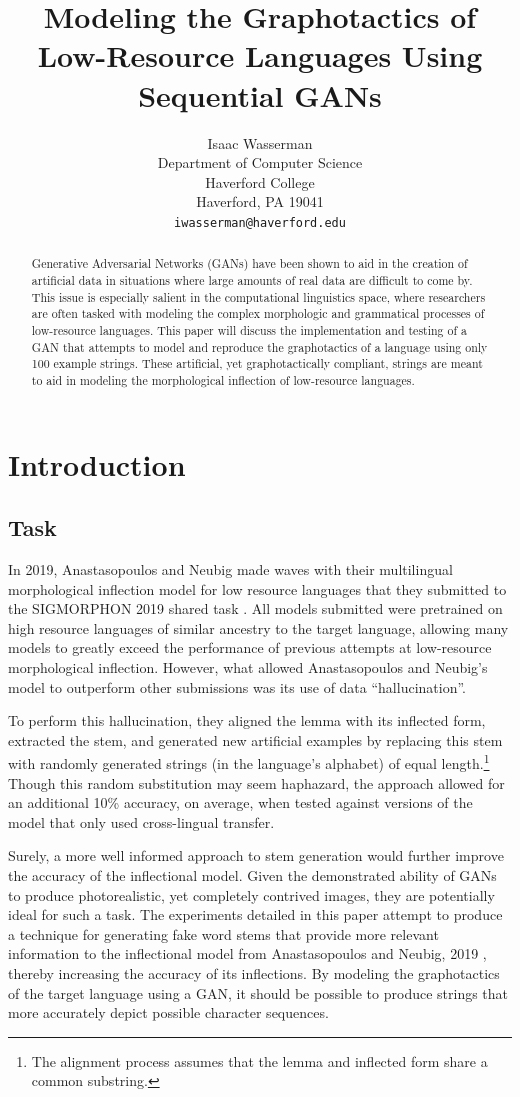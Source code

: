 \documentclass{article}
\title{Modeling the Graphotactics of Low-Resource Languages Using Sequential GANs}
\author{%
  Isaac Wasserman\\
  Department of Computer Science\\
  Haverford College\\
  Haverford, PA 19041\\
  \texttt{iwasserman@haverford.edu} \\
}
\begin{document}
  \maketitle
  \begin{abstract}
    Generative Adversarial Networks (GANs) have been shown to aid in the creation of artificial data in situations where large amounts of real data are difficult to come by. This issue is especially salient in the computational linguistics space, where researchers are often tasked with modeling the complex morphologic and grammatical processes of low-resource languages. This paper will discuss the implementation and testing of a GAN that attempts to model and reproduce the graphotactics of a language using only 100 example strings. These artificial, yet graphotactically compliant, strings are meant to aid in modeling the morphological inflection of low-resource languages.
  \end{abstract}
  \section{Introduction}
    \subsection{Task}
      In 2019, Anastasopoulos and Neubig made waves with their multilingual morphological inflection model for low resource languages \cite{CMU} that they submitted to the SIGMORPHON 2019 shared task \cite{sigmorphon2019}. All models submitted were pretrained on high resource languages of similar ancestry to the target language, allowing many models to greatly exceed the performance of previous attempts at low-resource morphological inflection. However, what allowed Anastasopoulos and Neubig's model to outperform other submissions was its use of data ``hallucination''.
    
      To perform this hallucination, they aligned the lemma with its inflected form, extracted the stem, and generated new artificial examples by replacing this stem with randomly generated strings (in the language's alphabet) of equal length.\footnote{The alignment process assumes that the lemma and inflected form share a common substring.} Though this random substitution may seem haphazard, the approach allowed for an additional 10\% accuracy, on average, when tested against versions of the model that only used cross-lingual transfer.

      Surely, a more well informed approach to stem generation would further improve the accuracy of the inflectional model. Given the demonstrated ability of GANs to produce photorealistic, yet completely contrived images, they are potentially ideal for such a task. The experiments detailed in this paper attempt to produce a technique for generating fake word stems that provide more relevant information to the inflectional model from Anastasopoulos and Neubig, 2019 \cite{CMU}, thereby increasing the accuracy of its inflections. By modeling the graphotactics of the target language using a GAN, it should be possible to produce strings that more accurately depict possible character sequences.
\end{document}
